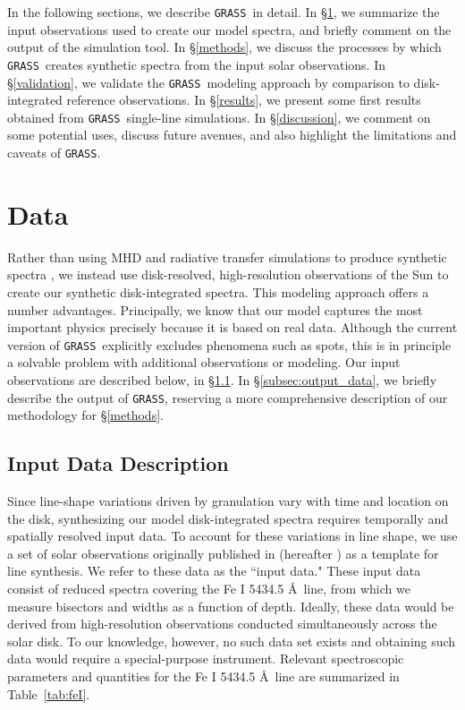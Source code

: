 \documentclass[twocolumn]{aastex63}
\newcommand{\grass}{\texttt{GRASS}}
\begin{document}
In the following sections, we describe \grass\ in detail. In \S\ref{data}, we summarize the input observations used to create our model spectra, and briefly comment on the output of the simulation tool. In \S\ref{methods}, we discuss the processes by which \grass\ creates synthetic spectra from the input solar observations. In \S\ref{validation}, we validate the \grass\ modeling approach by comparison to disk-integrated reference observations. In \S\ref{results}, we present some first results obtained from \grass\ single-line simulations. In \S\ref{discussion}, we comment on some potential uses, discuss future avenues, and also highlight the limitations and caveats of \grass. \par 

\section{Data} \label{data}

Rather than using MHD and radiative transfer simulations to produce synthetic spectra \citep[as in previous studies; e.g.,][]{Cegla2018, Cegla2019a}, we instead use disk-resolved, high-resolution observations of the Sun to create our synthetic disk-integrated spectra. This modeling approach offers a number advantages. Principally, we know that our model captures the most important physics precisely because it is based on real data. Although the current version of \grass\ explicitly excludes phenomena such as spots, this is in principle a solvable problem with additional observations or modeling. Our input observations are described below, in \S \ref{subsec:input_data}. In \S \ref{subsec:output_data}, we briefly describe the output of \texttt{GRASS}, reserving a more comprehensive description of our methodology for \S \ref{methods}. \par

\subsection{Input Data Description} \label{subsec:input_data}
Since line-shape variations driven by granulation vary with time and location on the disk, synthesizing our model disk-integrated spectra requires temporally and spatially resolved input data. To account for these variations in line shape, we use a set of solar observations originally published in \citealt{Lohner-Bottcher2019} (hereafter ) as a template for line synthesis. We refer to these data as the ``input data." These input data consist of reduced spectra covering the Fe \textsc{I} 5434.5 \AA\ line, from which we measure bisectors and widths as a function of depth. Ideally, these data would be derived from high-resolution observations conducted simultaneously across the solar disk. To our knowledge, however, no such data set exists and obtaining such data would require a special-purpose instrument. Relevant spectroscopic parameters and quantities for the Fe \textsc{I} 5434.5 \AA\ line are summarized in Table~\ref{tab:feI}. \par
\end{document}
